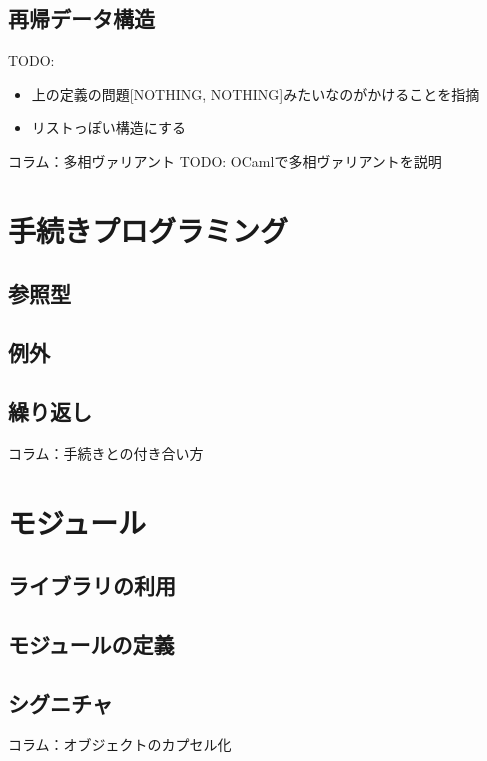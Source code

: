 \documentclass[11pt,a4paper]{article}
\begin{document}
\subsection{再帰データ構造}
TODO:
\begin{itemize}
\item 上の定義の問題[NOTHING, NOTHING]みたいなのがかけることを指摘
\item リストっぽい構造にする
\end{itemize}

\begin{itembox}[l]{コラム：多相ヴァリアント}
  TODO:
OCamlで多相ヴァリアントを説明
\end{itembox}

\section{手続きプログラミング}
\subsection{参照型}
\subsection{例外}
\subsection{繰り返し}

\begin{itembox}[l]{コラム：手続きとの付き合い方}

\end{itembox}

\section{モジュール}
\subsection{ライブラリの利用}
\subsection{モジュールの定義}
\subsection{シグニチャ}
\begin{itembox}[l]{コラム：オブジェクトのカプセル化}
\end{itembox}
\end{document}
